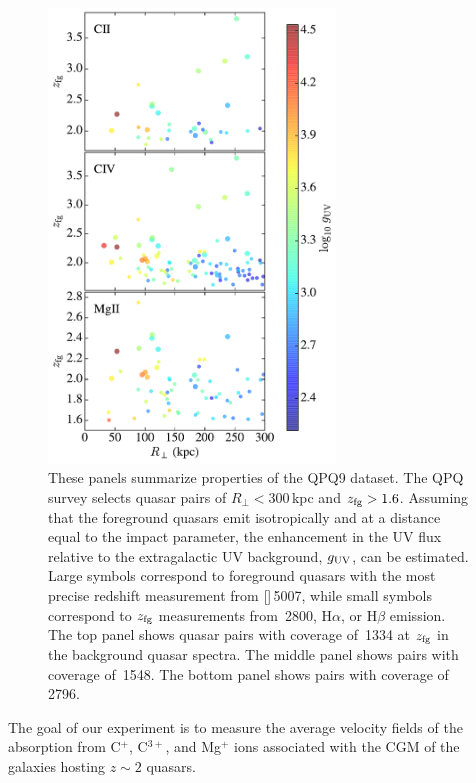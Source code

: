 \documentclass[iop]{emulateapj}
\begin{document}
\begin{figure}
\includegraphics[width=3in]{Figures/fig_experiment.pdf}
\caption{These panels summarize properties of the QPQ9 dataset. The QPQ survey selects 
quasar pairs of $R_\perp < 300$\,kpc and $z_{\rm fg}>1.6$. Assuming that the foreground quasars 
emit isotropically and at a distance equal to the impact parameter, the enhancement in the UV 
flux relative to the extragalactic UV background, $g_{\rm UV}$, can be estimated. Large 
symbols correspond to foreground quasars with the most precise redshift measurement from 
[]\,5007, while small symbols correspond to $z_{\rm fg}$ 
measurements from \,2800, H$\alpha$, or H$\beta$ emission. The top panel shows 
quasar pairs with coverage of \,1334 at $z_{\rm fg}$ in the background quasar spectra. 
The middle panel shows pairs with coverage of \,1548. The bottom panel shows 
pairs with coverage of \,2796. 
}
\label{fig:experiment}
\end{figure}

The goal of our experiment is to measure the average velocity fields of the absorption from C$^+$, 
C$^{3+}$, and Mg$^+$ ions associated with the CGM of the galaxies hosting $z\sim 2$ quasars. 
\end{document}
